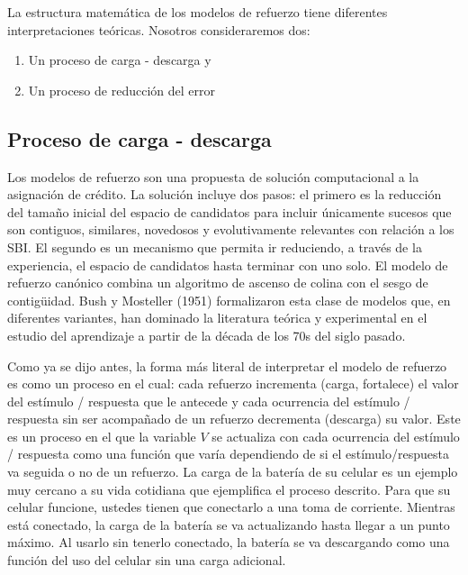 \documentclass[
  letterpaper,
]{book}
\providecommand{\tightlist}{%
  \setlength{\itemsep}{0pt}\setlength{\parskip}{0pt}}\usepackage{longtable,booktabs,array}
\begin{document}
La estructura matemática de los modelos de refuerzo tiene diferentes
interpretaciones teóricas. Nosotros consideraremos dos:

\begin{enumerate}
\def\labelenumi{\arabic{enumi}.}
\tightlist
\item
  Un proceso de carga - descarga y
\item
  Un proceso de reducción del error
\end{enumerate}

\subsection{Proceso de carga -
descarga}\label{proceso-de-carga---descarga}

Los modelos de refuerzo son una propuesta de solución computacional a la
asignación de crédito. La solución incluye dos pasos: el primero es la
reducción del tamaño inicial del espacio de candidatos para incluir
únicamente sucesos que son contiguos, similares, novedosos y
evolutivamente relevantes con relación a los SBI. El segundo es un
mecanismo que permita ir reduciendo, a través de la experiencia, el
espacio de candidatos hasta terminar con uno solo. El modelo de refuerzo
canónico combina un algoritmo de ascenso de colina con el sesgo de
contigüidad. Bush y Mosteller (1951) formalizaron esta clase de modelos
que, en diferentes variantes, han dominado la literatura teórica y
experimental en el estudio del aprendizaje a partir de la década de los
70s del siglo pasado.

Como ya se dijo antes, la forma más literal de interpretar el modelo de
refuerzo es como un proceso en el cual: cada refuerzo incrementa (carga,
fortalece) el valor del estímulo / respuesta que le antecede y cada
ocurrencia del estímulo / respuesta sin ser acompañado de un refuerzo
decrementa (descarga) su valor. Este es un proceso en el que la variable
\(V\) se actualiza con cada ocurrencia del estímulo / respuesta como una
función que varía dependiendo de si el estímulo/respuesta va seguida o
no de un refuerzo. La carga de la batería de su celular es un ejemplo
muy cercano a su vida cotidiana que ejemplifica el proceso descrito.
Para que su celular funcione, ustedes tienen que conectarlo a una toma
de corriente. Mientras está conectado, la carga de la batería se va
actualizando hasta llegar a un punto máximo. Al usarlo sin tenerlo
conectado, la batería se va descargando como una función del uso del
celular sin una carga adicional.
\end{document}
